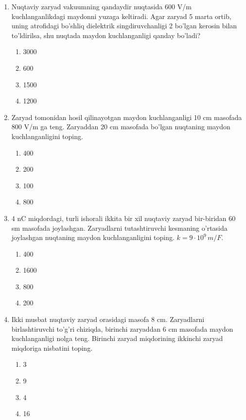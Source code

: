 \begin{enumerate}
    \item Nuqtaviy zaryad vakuumning qandaydir nuqtasida 600 V/m kuchlanganlikdagi maydonni yuzaga keltiradi. Agar zaryad 5 marta ortib, uning atrofidagi bo’shliq dielektrik singdiruvchanligi 2 bo’lgan kerosin bilan to’ldirilsa, shu nuqtada maydon kuchlanganligi qanday bo’ladi? 
    \begin{enumerate}[label=\Alph*)]
        \item 3000
        \item 600
        \item 1500 %
        \item 1200
    \end{enumerate}

    \item Zaryad tomonidan hosil qilinayotgan maydon kuchlanganligi 10 cm masofada 800 V/m ga teng. Zaryaddan 20 cm masofada bo’lgan nuqtaning maydon kuchlanganligini toping. 
    \begin{enumerate}[label=\Alph*)]
        \item 400
        \item 200 %
        \item 100
        \item 800
    \end{enumerate}

    \item 4 nC miqdordagi, turli ishorali ikkita bir xil nuqtaviy zaryad bir-biridan 60 sm masofada joylashgan. Zaryadlarni tutashtiruvchi kesmaning o’rtasida joylashgan nuqtaning maydon kuchlanganligini toping. $k=9 \cdot 10^9 \, m/F$. 
    \begin{enumerate}[label=\Alph*)]
        \item 400
        \item 1600
        \item 800 %
        \item 200
    \end{enumerate}

    \item Ikki musbat nuqtaviy zaryad orasidagi masofa 8 cm. Zaryadlarni birlashtiruvchi to’g’ri chiziqda, birinchi zaryaddan 6 cm masofada maydon kuchlanganligi nolga teng. Birinchi zaryad miqdorining ikkinchi zaryad miqdoriga nisbatini toping. 
    \begin{enumerate}[label=\Alph*)]
        \item 3
        \item 9 %
        \item 4
        \item 16
    \end{enumerate}


\end{enumerate}
